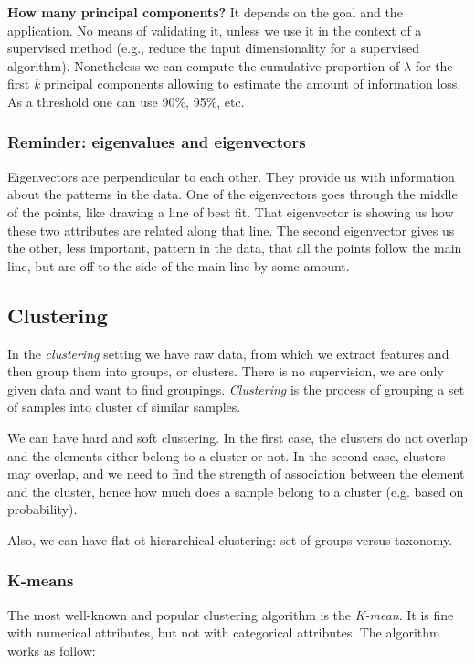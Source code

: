 \documentclass{article}
\begin{document}
\textbf{How many principal components?} It depends on the goal and the application. No means of validating it, unless we use it in the context of a supervised method (e.g., reduce the input dimensionality for a supervised algorithm). Nonetheless we can compute the cumulative proportion of $\lambda$ for the first \emph{k} principal components allowing to estimate the amount of information loss. As a threshold one can use 90\%, 95\%, etc.


\subsubsection*{Reminder: eigenvalues and eigenvectors}
	
Eigenvectors are perpendicular to each other. They provide us with information about the patterns in the data. One of the eigenvectors goes through the middle of the points, like drawing a line of best fit. That eigenvector is showing us how these two attributes are related along that line. The second eigenvector gives us the other, less important, pattern in the  data, that all the points follow the main  line, but are off to the side of the main line by some amount.
	
	
	
\subsection*{Clustering}
	
In the \emph{clustering} setting we have raw data, from which we extract features and then group them into groups, or clusters. There is no supervision, we are only given data and want to find groupings. \emph{Clustering} is the process of grouping a set of samples into cluster of similar samples.

We can have hard and soft clustering. In the first case, the clusters do not overlap and the elements either belong to a cluster or not. In the second case, clusters may overlap, and we need to find the strength of association between the element and the cluster, hence how much does a sample belong to a cluster (e.g. based on probability).

Also, we can have flat ot hierarchical clustering: set of groups versus taxonomy.


\bigskip
\subsubsection*{K-means}
The most well-known and popular clustering algorithm is the \emph{K-mean}. It is fine with numerical attributes, but not with categorical attributes. The algorithm works as follow:
\end{document}
